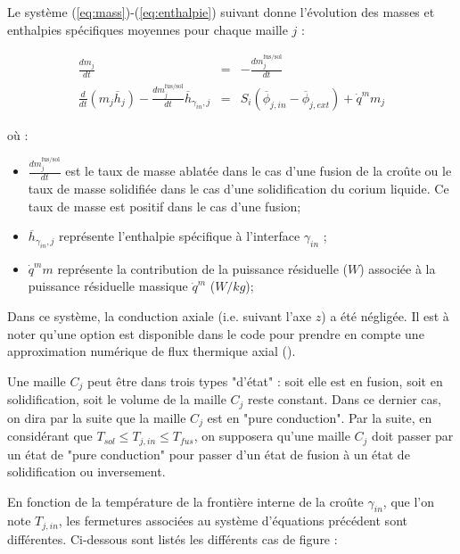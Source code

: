 Le système (\ref{eq:mass})-(\ref{eq:enthalpie}) suivant donne l'évolution des masses et enthalpies spécifiques moyennes pour chaque maille $j$ :

\begin{eqnarray}
\frac{dm_{j}}{dt} &=& - \frac{dm_{j}^\text{fus/sol}}{dt} \label{eq:mass} \\ 
 \frac{d}{dt}(m_{j}\overline{h}_{j}) - \frac{dm_{j}^\text{fus/sol}}{dt} \overline{h}_{\gamma_{in},j} & = & S_i\left(\overline{\phi}_{j,in} - \overline{\phi}_{j,ext}\right) + \dot{q}^m m_{j} \label{eq:enthalpie}
\end{eqnarray}

où :

\begin{itemize}
 \item $\frac{dm_j^\text{fus/sol}}{dt}$ est le taux de masse ablatée dans le cas d'une fusion de la croûte ou le taux de masse solidifiée dans le cas d'une solidification du corium liquide. Ce taux de masse est positif dans le cas d'une fusion;
 \item $\overline{h}_{\gamma_{in},j}$ représente l'enthalpie spécifique à l’interface $\gamma_{in}$ ;
 \item $\dot{q}^m m$ représente la contribution de la puissance résiduelle ($W$) associée à la puissance résiduelle massique $\dot{q}^m$ ($W/kg$);
\end{itemize}
Dans ce système, la conduction axiale (i.e. suivant l'axe $z$) a été négligée. Il est à noter qu'une option est disponible dans le code pour prendre en compte une approximation numérique de flux thermique axial (\cite{Peybernes2018}). 

Une maille $C_j$ peut être dans trois types "d'état" : soit elle est en fusion, soit en solidification, soit le volume de la maille $C_j$ reste constant. Dans ce dernier cas, on dira par la suite que la maille $C_j$ est en "pure conduction". Par la suite, en considérant que $T_{sol}\leq T_{j,in}\leq T_{fus}$, on supposera qu'une maille $C_j$ doit passer par un état de "pure conduction" pour passer d'un état de fusion à un état de solidification ou inversement.

En fonction de la température de la frontière interne de la croûte $\gamma_{in}$, que l'on note $T_{j,in}$, les fermetures associées au système d'équations précédent sont différentes. Ci-dessous sont listés les différents cas de figure :\\

